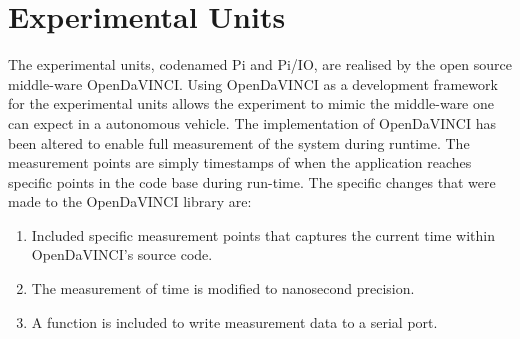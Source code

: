 


\section{Experimental Units}
\label{section:exp-units}

The experimental units, codenamed Pi and Pi/IO, are realised by the open source middle-ware OpenDaVINCI. Using OpenDaVINCI as a development framework for the experimental units allows the experiment to mimic the middle-ware one can expect in a autonomous vehicle. The implementation of OpenDaVINCI has been altered to enable full measurement of the system during runtime. The measurement points are simply timestamps of when the application reaches specific points in the code base during run-time. The specific changes that were made to the OpenDaVINCI library are: \\

\begin{enumerate}
\item Included specific measurement points that captures the current time within OpenDaVINCI's source code.
\item The measurement of time is modified to nanosecond precision.
\item A function is included to write measurement data to a serial port.\\
\end{enumerate}

